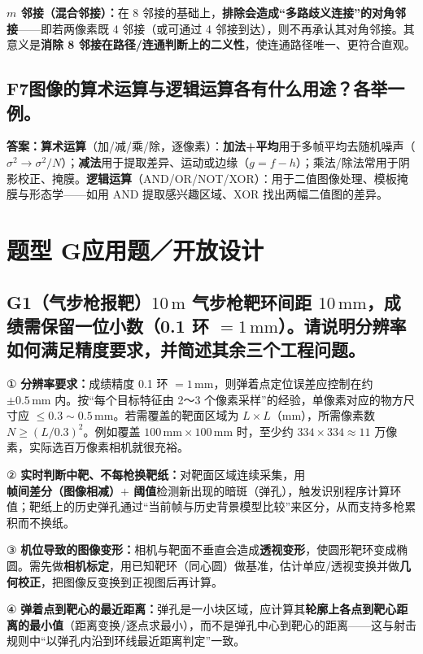\textbf{$m$ 邻接（混合邻接）：}在 8 邻接的基础上，\textbf{排除会造成“多路歧义连接”的对角邻接}——即若两像素既 4 邻接（或可通过 4 邻接到达），则不再承认其对角邻接。其意义是\textbf{消除 8 邻接在路径/连通判断上的二义性}，使连通路径唯一、更符合直观。

\subsection*{F7\quad 图像的算术运算与逻辑运算各有什么用途？各举一例。}
\textbf{答案：算术运算}（加/减/乘/除，逐像素）：\textbf{加法+平均}用于多帧平均去随机噪声（$\sigma^2\to\sigma^2/N$）；\textbf{减法}用于提取差异、运动或边缘（$g=f-h$）；乘法/除法常用于阴影校正、掩膜。\textbf{逻辑运算}（AND/OR/NOT/XOR）：用于二值图像处理、模板掩膜与形态学——如用 AND 提取感兴趣区域、XOR 找出两幅二值图的差异。

\section*{题型 G\quad 应用题／开放设计}
\subsection*{G1\quad （气步枪报靶）$10\,\mathrm{m}$ 气步枪靶环间距 $10\,\mathrm{mm}$，成绩需保留一位小数（0.1 环 $=1\,\mathrm{mm}$）。请说明分辨率如何满足精度要求，并简述其余三个工程问题。}
① \textbf{分辨率要求：}成绩精度 0.1 环 $=1\,\mathrm{mm}$，则弹着点定位误差应控制在约 $\pm0.5\,\mathrm{mm}$ 内。按“每个目标特征由 2～3 个像素采样”的经验，单像素对应的物方尺寸应 $\leq0.3\sim0.5\,\mathrm{mm}$。若需覆盖的靶面区域为 $L\times L$（mm），所需像素数 $N\geq(L/0.3)^2$。例如覆盖 $100\,\mathrm{mm}\times100\,\mathrm{mm}$ 时，至少约 $334\times334\approx11$ 万像素，实际选百万像素相机就很充裕。

② \textbf{实时判断中靶、不每枪换靶纸：}对靶面区域连续采集，用\textbf{帧间差分（图像相减）$+$ 阈值}检测新出现的暗斑（弹孔），触发识别程序计算环值；靶纸上的历史弹孔通过“当前帧与历史背景模型比较”来区分，从而支持多枪累积而不换纸。

③ \textbf{机位导致的图像变形：}相机与靶面不垂直会造成\textbf{透视变形}，使圆形靶环变成椭圆。需先做\textbf{相机标定}，用已知靶环（同心圆）做基准，估计单应/透视变换并做\textbf{几何校正}，把图像反变换到正视图后再计算。

④ \textbf{弹着点到靶心的最近距离：}弹孔是一小块区域，应计算其\textbf{轮廓上各点到靶心距离的最小值}（距离变换/逐点求最小），而不是弹孔中心到靶心的距离——这与射击规则中“以弹孔内沿到环线最近距离判定”一致。

